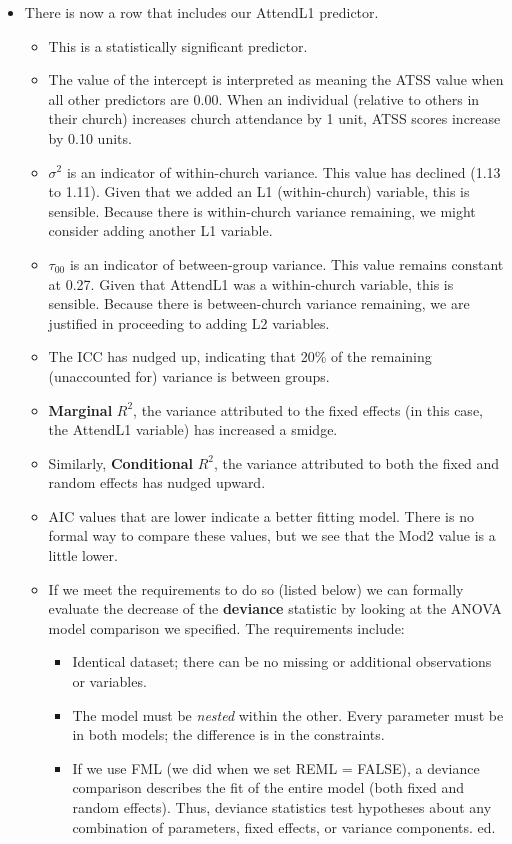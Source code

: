 \documentclass[
  11pt,
]{book}
\providecommand{\tightlist}{%
  \setlength{\itemsep}{0pt}\setlength{\parskip}{0pt}}
\begin{document}
\begin{itemize}
\tightlist
\item
  There is now a row that includes our AttendL1 predictor.

  \begin{itemize}
  \tightlist
  \item
    This is a statistically significant predictor.
  \item
    The value of the intercept is interpreted as meaning the ATSS value when all other predictors are 0.00. When an individual (relative to others in their church) increases church attendance by 1 unit, ATSS scores increase by 0.10 units.
  \item
    \(\sigma^{2}\) is an indicator of within-church variance. This value has declined (1.13 to 1.11). Given that we added an L1 (within-church) variable, this is sensible. Because there is within-church variance remaining, we might consider adding another L1 variable.
  \item
    \(\tau _{00}\) is an indicator of between-group variance. This value remains constant at 0.27. Given that AttendL1 was a within-church variable, this is sensible. Because there is between-church variance remaining, we are justified in proceeding to adding L2 variables.
  \item
    The ICC has nudged up, indicating that 20\% of the remaining (unaccounted for) variance is between groups.
  \item
    \textbf{Marginal} \(R^2\), the variance attributed to the fixed effects (in this case, the AttendL1 variable) has increased a smidge.
  \item
    Similarly, \textbf{Conditional} \(R^2\), the variance attributed to both the fixed and random effects has nudged upward.
  \item
    AIC values that are lower indicate a better fitting model. There is no formal way to compare these values, but we see that the Mod2 value is a little lower.
  \item
    If we meet the requirements to do so (listed below) we can formally evaluate the decrease of the \textbf{deviance} statistic by looking at the ANOVA model comparison we specified. The requirements include:

    \begin{itemize}
    \tightlist
    \item
      Identical dataset; there can be no missing or additional observations or variables.
    \item
      The model must be \emph{nested} within the other. Every parameter must be in both models; the difference is in the constraints.
    \item
      If we use FML (we did when we set REML = FALSE), a deviance comparison describes the fit of the entire model (both fixed and random effects). Thus, deviance statistics test hypotheses about any combination of parameters, fixed effects, or variance components.
      ed.
    \end{itemize}
  \end{itemize}
\end{itemize}
\end{document}
